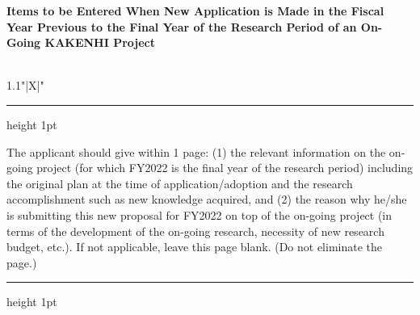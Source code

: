 \documentclass[8pt]{extarticle}
\makeatletter
\newcommand{\thickhline}{%
	\noalign {\ifnum 0=`}\fi \hrule height 1pt
	\futurelet \reserved@a \@xhline
}
\makeatother
\begin{document}
	
\noindent\textbf{\fontsize{12}{12}\selectfont Items to be Entered When New Application is Made in the Fiscal Year Previous to the Final Year of the Research Period of an On-Going KAKENHI Project}\\
\indent {}\\
\begin{tabularx}{1.1\linewidth}{"|X|"}
	\thickhline
	The applicant should give within 1 page: (1) the relevant information on the on-going project (for which FY2022 is the final year of the research period) including the original plan at the time of application/adoption and the research accomplishment such as new knowledge acquired, and (2) the reason why he/she is submitting this new proposal for FY2022 on top of the on-going project (in terms of the development of the on-going research, necessity of new research budget, etc.). If not applicable, leave this page blank. (Do not eliminate the page.) 
	\\
	\thickhline
\end{tabularx}
\end{document}
